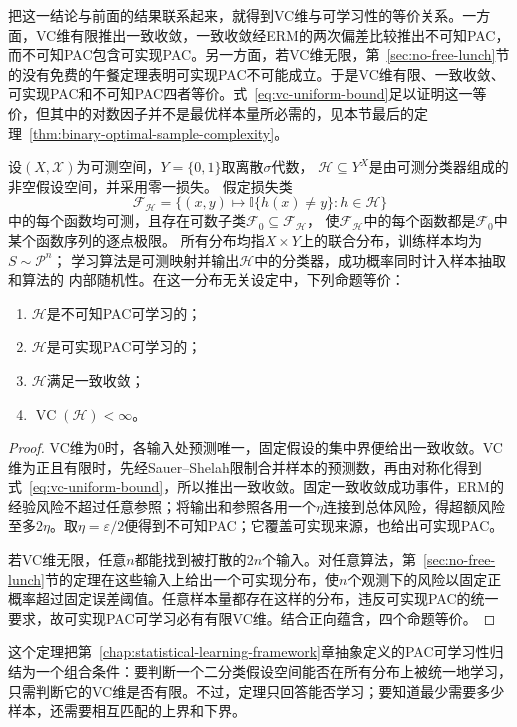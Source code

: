 把这一结论与前面的结果联系起来，就得到VC维与可学习性的等价关系。一方面，VC维有限推出一致收敛，一致收敛经ERM的两次偏差比较推出不可知PAC，而不可知PAC包含可实现PAC。另一方面，若VC维无限，第~\ref{sec:no-free-lunch}节的没有免费的午餐定理表明可实现PAC不可能成立。于是VC维有限、一致收敛、可实现PAC和不可知PAC四者等价。式~\eqref{eq:vc-uniform-bound}足以证明这一等价，但其中的对数因子并不是最优样本量所必需的，见本节最后的定理~\ref{thm:binary-optimal-sample-complexity}。

\begin{theorem}[二分类学习基本定理]
\label{thm:binary-fundamental-theorem}
设$(X,\mathcal X)$为可测空间，$Y=\{0,1\}$取离散$\sigma$代数，
$\mathcal H\subseteq Y^X$是由可测分类器组成的非空假设空间，并采用零一损失。
假定损失类
\[
 \mathcal F_{\mathcal H}
 =\{(x,y)\mapsto\mathbb I\{h(x)\neq y\}:h\in\mathcal H\}
\]
中的每个函数均可测，且存在可数子类$\mathcal F_0\subseteq\mathcal F_{\mathcal H}$，
使$\mathcal F_{\mathcal H}$中的每个函数都是$\mathcal F_0$中某个函数序列的逐点极限。
所有分布均指$X\times Y$上的联合分布，训练样本均为$S\sim\mathcal P^n$；
学习算法是可测映射并输出$\mathcal H$中的分类器，成功概率同时计入样本抽取和算法的
内部随机性。在这一分布无关设定中，下列命题等价：
\begin{enumerate}
 \item $\mathcal H$是不可知PAC可学习的；
 \item $\mathcal H$是可实现PAC可学习的；
 \item $\mathcal H$满足一致收敛；
 \item $\operatorname{VC}(\mathcal H)<\infty$。
\end{enumerate}
\end{theorem}
\begin{proof}
VC维为0时，各输入处预测唯一，固定假设的集中界便给出一致收敛。VC维为正且有限时，先经Sauer--Shelah限制合并样本的预测数，再由对称化得到式~\eqref{eq:vc-uniform-bound}，所以推出一致收敛。固定一致收敛成功事件，ERM的经验风险不超过任意参照；将输出和参照各用一个$\eta$连接到总体风险，得超额风险至多$2\eta$。取$\eta=\varepsilon/2$便得到不可知PAC；它覆盖可实现来源，也给出可实现PAC。

若VC维无限，任意$n$都能找到被打散的$2n$个输入。对任意算法，第~\ref{sec:no-free-lunch}节的定理在这些输入上给出一个可实现分布，使$n$个观测下的风险以固定正概率超过固定误差阈值。任意样本量都存在这样的分布，违反可实现PAC的统一要求，故可实现PAC可学习必有有限VC维。结合正向蕴含，四个命题等价。
\end{proof}

这个定理把第~\ref{chap:statistical-learning-framework}章抽象定义的PAC可学习性归结为一个组合条件：要判断一个二分类假设空间能否在所有分布上被统一地学习，只需判断它的VC维是否有限。不过，定理只回答能否学习；要知道最少需要多少样本，还需要相互匹配的上界和下界。

